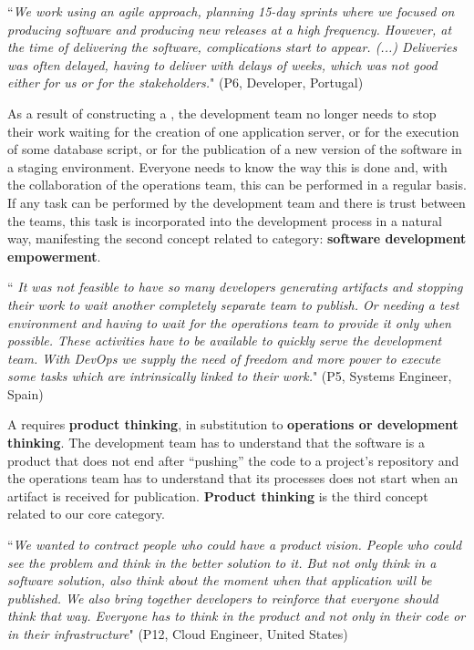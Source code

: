\begin{mq}
``\emph{We work using an agile approach, planning 15-day sprints where we focused on
producing software and producing new releases at a high frequency. However, at the time of
delivering the software, complications start to appear. (...) Deliveries was often delayed,
having to deliver with delays of weeks, which was not good either for us or for
the stakeholders.}" (P6, Developer, Portugal)
\end{mq}

As a result of constructing a \cc, the development
team no longer needs to stop their work waiting for the creation
of one application server, or for the execution of some database script, or for
the publication of a new version of the software in a staging environment.
Everyone needs to know the way this is done and, with the collaboration of the
operations team, this can be performed in a regular basis. If any task can be
performed by the development team and there is trust between the teams, this task is
incorporated into the development process in a natural way, manifesting the
second concept related to \cc category: \textbf{software
development empowerment}.

\begin{mq}
``\emph{
It was not feasible to have so many developers generating artifacts and
stopping their work to wait another completely separate team to publish. Or
needing a test environment and having to wait for the operations team to
provide it only when possible. These activities have to be available to quickly
serve the development team. With DevOps we supply the need of freedom and
more power to execute some tasks which are intrinsically linked to their work.}"
(P5, Systems Engineer, Spain)
\end{mq}

A \cc requires  \textbf{product thinking}, in substitution to
\textbf{operations or development thinking}. The development team has to understand that
the software is a product that does not end after ``pushing'' the code to a
project's repository and the operations team has to understand that its processes does not
start when an artifact is received for publication. \textbf{Product thinking}
is the third concept related to our core category.

\begin{mq}
``\emph{We wanted to
contract people who could have a product vision. People who could see the
problem and think in the better solution to it. But not only think in a
software solution, also think about the moment when that application will be
published. We also bring together developers to reinforce that everyone
should think that way. Everyone has to think in the product and not only in
their code or in their infrastructure}" (P12, Cloud Engineer, United States)
\end{mq}


